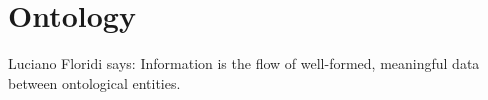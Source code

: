 \chapter{Ontology}
Luciano Floridi  says:
Information is the flow of well-formed, meaningful data between ontological entities.